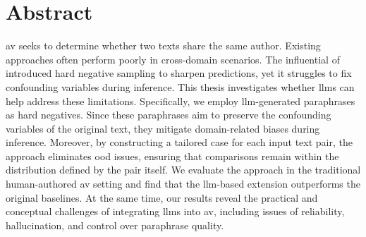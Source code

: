 \chapter*{Abstract}

\Acl{av} seeks to determine whether two texts share the same author. 
Existing approaches often perform poorly in cross-domain scenarios. 
The influential \impAppr{} of \citet{koppel_determining_2014} introduced hard negative sampling to sharpen predictions, yet it struggles to fix confounding variables during inference. 
This thesis investigates whether \aclp{llm} can help address these limitations. 
Specifically, we employ \acs{llm}-generated paraphrases as hard negatives. 
Since these paraphrases aim to preserve the confounding variables of the original text, they mitigate domain-related biases during inference. 
Moreover, by constructing a tailored case for each input text pair, the approach eliminates \acl{ood} issues, ensuring that comparisons remain within the distribution defined by the pair itself.
We evaluate the approach in the traditional human-authored \acl{av} setting and find that the \acs{llm}-based extension outperforms the original baselines. 
At the same time, our results reveal the practical and conceptual challenges of integrating \acsp{llm} into \acl{av}, including issues of reliability, hallucination, and control over paraphrase quality.



